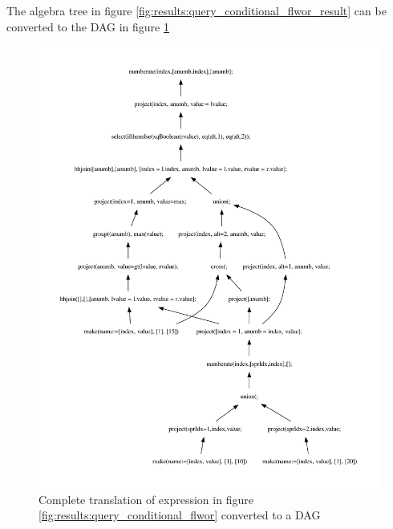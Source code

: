 The algebra tree in figure \ref{fig:results:query_conditional_flwor_result} can
be converted to the DAG in figure
\ref{fig:results:query_conditional_flwor_result_dag}

\begin{figure}[!htp]
\begin{center} 
  \includegraphics[width=1.0\textwidth]{img/graphs/td_impl_flwor_ifthenelse_xq_relalg_dag} 
  \caption{Complete translation of expression in figure
  \ref{fig:results:query_conditional_flwor} converted to a DAG}
  \label{fig:results:query_conditional_flwor_result_dag}
\end{center}
\end{figure}
